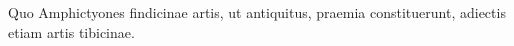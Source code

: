 Quo Amphictyones findicinae artis, ut
antiquitus, praemia constituerunt, adiectis etiam artis tibicinae.




























